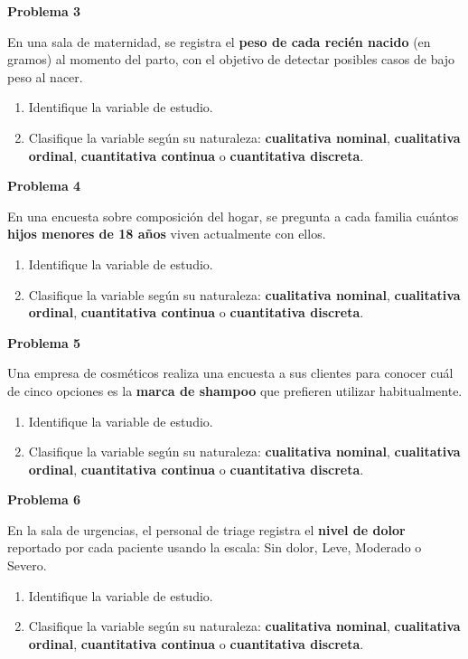 \documentclass[10pt,letterpaper]{article}
\newcommand{\problema}[1]{%
  \vspace{2pt}%
  \begin{tcolorbox}[
    enhanced,
    colback=white,
    colframe=black,
    arc=0pt,
    boxrule=0pt,
    leftrule=2pt,
    left=6pt, right=6pt,
    top=1pt, bottom=1pt,
  ]
    {\normalsize\bfseries\sffamily #1}
  \end{tcolorbox}%
  \vspace{1pt}%
}
\begin{document}
\problema{Problema 3}
\noindent\sffamily\small En una sala de maternidad, se registra el \textbf{peso de cada reci\'en nacido} (en gramos) al momento del parto, con el objetivo de detectar posibles casos de bajo peso al nacer.
\begin{enumerate}[leftmargin=1.2cm, label=\textbf{\alph*)}, itemsep=0pt, topsep=2pt]
  \item Identifique la variable de estudio.
  \item Clasifique la variable seg\'un su naturaleza: \textbf{cualitativa nominal}, \textbf{cualitativa ordinal}, \textbf{cuantitativa continua} o \textbf{cuantitativa discreta}.
\end{enumerate}

\problema{Problema 4}
\noindent\sffamily\small En una encuesta sobre composici\'on del hogar, se pregunta a cada familia cu\'antos \textbf{hijos menores de 18 a\~nos} viven actualmente con ellos.
\begin{enumerate}[leftmargin=1.2cm, label=\textbf{\alph*)}, itemsep=0pt, topsep=2pt]
  \item Identifique la variable de estudio.
  \item Clasifique la variable seg\'un su naturaleza: \textbf{cualitativa nominal}, \textbf{cualitativa ordinal}, \textbf{cuantitativa continua} o \textbf{cuantitativa discreta}.
\end{enumerate}

\problema{Problema 5}
\noindent\sffamily\small Una empresa de cosm\'eticos realiza una encuesta a sus clientes para conocer cu\'al de cinco opciones es la \textbf{marca de shampoo} que prefieren utilizar habitualmente.
\begin{enumerate}[leftmargin=1.2cm, label=\textbf{\alph*)}, itemsep=0pt, topsep=2pt]
  \item Identifique la variable de estudio.
  \item Clasifique la variable seg\'un su naturaleza: \textbf{cualitativa nominal}, \textbf{cualitativa ordinal}, \textbf{cuantitativa continua} o \textbf{cuantitativa discreta}.
\end{enumerate}

\problema{Problema 6}
\noindent\sffamily\small En la sala de urgencias, el personal de triage registra el \textbf{nivel de dolor} reportado por cada paciente usando la escala: Sin dolor, Leve, Moderado o Severo.
\begin{enumerate}[leftmargin=1.2cm, label=\textbf{\alph*)}, itemsep=0pt, topsep=2pt]
  \item Identifique la variable de estudio.
  \item Clasifique la variable seg\'un su naturaleza: \textbf{cualitativa nominal}, \textbf{cualitativa ordinal}, \textbf{cuantitativa continua} o \textbf{cuantitativa discreta}.
\end{enumerate}
\end{document}
